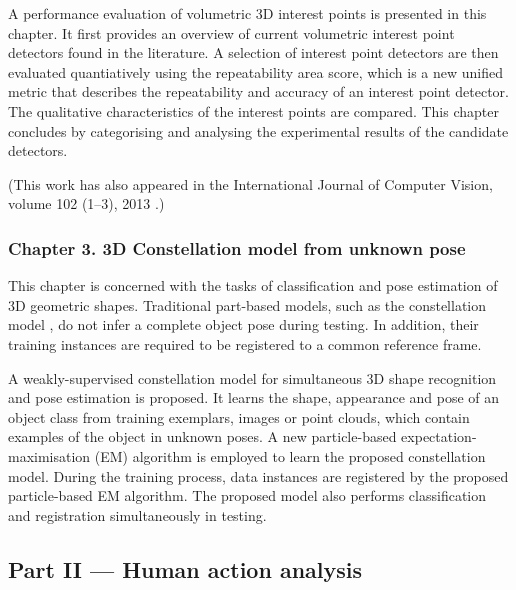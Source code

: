 A performance evaluation of volumetric 3D interest points is presented in this chapter. 
It first provides an overview of current volumetric interest point detectors found in the literature. 
A selection of interest point detectors are then evaluated quantiatively using the repeatability area score, which is a new unified metric that describes the repeatability and accuracy of an interest point detector. 
The qualitative characteristics of the interest points are compared.  
This chapter concludes by categorising and analysing the experimental results of the candidate detectors.

(This work has also appeared in the International Journal of Computer Vision, volume 102 (1--3), 2013 \cite{Yu2013a}.)  

\subsubsection*{Chapter 3. 3D Constellation model from unknown pose}

This chapter is concerned with the tasks of classification and pose estimation of 3D geometric shapes. 
Traditional part-based models, such as the constellation model \cite{Weber2000}, do not infer a complete object pose during testing. In addition, their training instances are required to be registered to a common reference frame.

A weakly-supervised constellation model for simultaneous 3D shape recognition and pose estimation is proposed. 
It learns the shape, appearance and pose of an object class from training exemplars, \eg images or point clouds, which contain examples of the object in unknown poses. 
A new particle-based expectation-maximisation (EM) algorithm is employed to learn the proposed constellation model. During the training process, data instances are registered by the proposed particle-based EM algorithm.
The proposed model also performs classification and registration simultaneously in testing. 

\subsection*{Part II --- Human action analysis}


